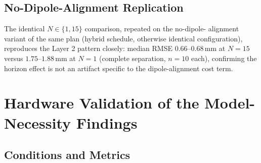 \documentclass[journal]{IEEEtran}
\begin{document}
\subsection{No-Dipole-Alignment Replication}
\label{sec:ph-nodipole}

The identical $N\in\{1,15\}$ comparison, repeated on the no-dipole-
alignment variant of the same plan (hybrid schedule, otherwise
identical configuration), reproduces the Layer 2 pattern closely:
median RMSE $0.66$--$0.68\,\mathrm{mm}$ at $N{=}15$ versus
$1.75$--$1.88\,\mathrm{mm}$ at $N{=}1$ (complete separation, $n{=}10$
each), confirming the horizon effect is not an artifact specific to
the dipole-alignment cost term.


\section{Hardware Validation of the Model-Necessity Findings}
\label{sec:hw-validation}

\subsection{Conditions and Metrics}
\label{sec:hw-conditions}
\end{document}
